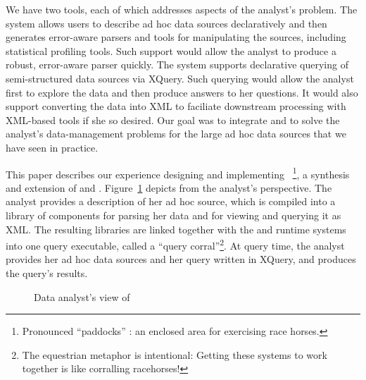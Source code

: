 
We have two tools, each of which addresses aspects of the analyst's
problem.  The \pads{} system allows users to describe ad hoc data
sources declaratively and then generates error-aware parsers and tools
for manipulating the sources, including statistical profiling tools.
Such support would allow the analyst to produce a robust, error-aware
parser quickly.  The \Galax{} system supports declarative querying of
semi-structured data sources via XQuery.  Such querying would allow
the analyst first to explore the data and then produce answers to her
questions.  It would also support converting the data into XML to
faciliate downstream processing with XML-based tools if she so
desired.  Our goal was to integrate \pads{} and \Galax{} to solve the
analyst's data-management problems for the large ad hoc data sources
that we have seen in practice.

This paper describes our experience designing and implementing
\padx{}~\footnote{Pronounced ``paddocks'' : an enclosed area for
exercising race horses.}, a synthesis and extension of \pads{} and
\Galax{}.  Figure~\ref{figure:padx-arch1} depicts \padx{} from the
analyst's perspective.  The analyst provides a \pads{} description of
her ad hoc source, which is compiled into a library of components for
parsing her data and for viewing and querying it as XML.  The
resulting libraries are linked together with the \pads{} and \Galax{}
runtime systems into one \padx{} query executable, called a ``query
corral''\footnote{The equestrian metaphor is intentional: Getting
these systems to work together is like corralling racehorses!}.  At
query time, the analyst provides her ad hoc data sources and her query
written in XQuery, and \padx{} produces the query's results.
\begin{figure}
\begin{center}
\end{center}
\caption{Data analyst's view of \padx{}}
\label{figure:padx-arch1}
\end{figure}

